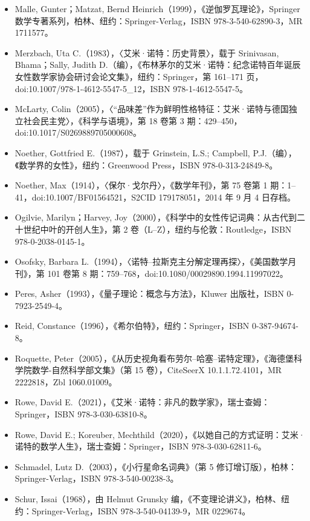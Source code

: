 \begin{itemize}
\item Malle, Gunter；Matzat, Bernd Heinrich（1999），《逆伽罗瓦理论》，Springer 数学专著系列，柏林、纽约：Springer-Verlag，ISBN 978-3-540-62890-3，MR 1711577。
\item Merzbach, Uta C.（1983），〈艾米·诺特：历史背景〉，载于 Srinivasan, Bhama；Sally, Judith D.（编），《布林茅尔的艾米·诺特：纪念诺特百年诞辰女性数学家协会研讨会论文集》，纽约：Springer，第 161–171 页，doi:10.1007/978-1-4612-5547-5_12，ISBN 978-1-4612-5547-5。
\item McLarty, Colin（2005），〈“品味差”作为鲜明性格特征：艾米·诺特与德国独立社会民主党〉，《科学与语境》，第 18 卷第 3 期：429–450，doi:10.1017/S0269889705000608。
\item Noether, Gottfried E.（1987），载于 Grinstein, L.S.; Campbell, P.J.（编），《数学界的女性》，纽约：Greenwood Press，ISBN 978-0-313-24849-8。
\item Noether, Max（1914），〈保尔·戈尔丹〉，《数学年刊》，第 75 卷第 1 期：1–41，doi:10.1007/BF01564521，S2CID 179178051，2014 年 9 月 4 日存档。
\item Ogilvie, Marilyn；Harvey, Joy（2000），《科学中的女性传记词典：从古代到二十世纪中叶的开创人生》，第 2 卷（L–Z），纽约与伦敦：Routledge，ISBN 978-0-2038-0145-1。
\item Osofsky, Barbara L.（1994），〈诺特–拉斯克主分解定理再探〉，《美国数学月刊》，第 101 卷第 8 期：759–768，doi:10.1080/00029890.1994.11997022。
\item Peres, Asher（1993），《量子理论：概念与方法》，Kluwer 出版社，ISBN 0-7923-2549-4。
\item Reid, Constance（1996），《希尔伯特》，纽约：Springer，ISBN 0-387-94674-8。
\item Roquette, Peter（2005），《从历史视角看布劳尔–哈塞–诺特定理》，《海德堡科学院数学-自然科学部文集》（第 15 卷），CiteSeerX 10.1.1.72.4101，MR 2222818，Zbl 1060.01009。
\item Rowe, David E.（2021），《艾米·诺特：非凡的数学家》，瑞士查姆：Springer，ISBN 978-3-030-63810-8。
\item Rowe, David E.; Koreuber, Mechthild（2020），《以她自己的方式证明：艾米·诺特的数学人生》，瑞士查姆：Springer，ISBN 978-3-030-62811-6。
\item Schmadel, Lutz D.（2003），《小行星命名词典》（第 5 修订增订版），柏林：Springer-Verlag，ISBN 978-3-540-00238-3。
\item Schur, Issai（1968），由 Helmut Grunsky 编，《不变理论讲义》，柏林、纽约：Springer-Verlag，ISBN 978-3-540-04139-9，MR 0229674。

\end{itemize}
